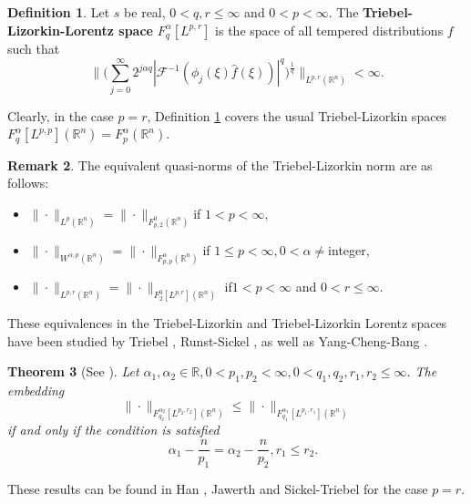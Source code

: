 \documentclass[12pt]{amsart}
\newcommand{\R}{\mathbb{R}}
\numberwithin{equation}{section}
\theoremstyle{plain}
\newtheorem{Thm}{Theorem}[section]
\theoremstyle{definition}
\newtheorem{Def}[Thm]{Definition}
\newtheorem{Rem}[Thm]{Remark}
\theoremstyle{remark}
\begin{document}
 \begin{Def}\label{Triebel}
 Let $s$ be real, $0<q,r\leq \infty$ and $0<p<\infty$. The \textbf{Triebel-Lizorkin-Lorentz  space} ${F}^{\alpha}_{q}[L^{p,r}]$ is the space of all tempered distributions $f$ such that
 \[
 \Big\| \Big(\sum_{j=0}^{\infty} 2^{j\alpha q} |\mathcal{F}^{-1}(\phi_{j}(\xi)\hat{f}(\xi))|^{q}\Big)^{\frac{1}{q}} \Big\|_{L^{p,r}(\R^{n})} <\infty.
 \]
 \end{Def}
 Clearly, in the case $p=r$, Definition \ref{Triebel} covers the usual Triebel-Lizorkin spaces ${F}^{\alpha}_{q}[L^{p,p}](\R^{n})=F^{\alpha}_{p}(\R^{n}).$
\begin{Rem}
The equivalent quasi-norms of the Triebel-Lizorkin norm are as follows:
\begin{itemize}
\item[(i)] $\|\cdot\|_{L^{p}(\R^{n})}=\|\cdot\|_{F^{0}_{p,2}(\R^{n})}$\;\;\quad\quad if \quad $1<p<\infty,$
\item[(ii)] $\|\cdot\|_{W^{\alpha,p}(\R^{n})}=\|\cdot\|_{F^{\alpha}_{p,p}(\R^{n})}$\;\;\quad if \quad $1\leq p<\infty, 0<\alpha\neq$integer,
\item[(iii)] $\|\cdot\|_{L^{p,r}(\R^{n})}=\|\cdot\|_{F^{0}_{2}[L^{p,r}](\R^{n})}$ \;if\quad\;$1<p<\infty$ and $0<r\leq \infty.$
\end{itemize}
These equivalences in the Triebel-Lizorkin and Triebel-Lizorkin Lorentz spaces have been studied by Triebel \cite{Tr}, Runst-Sickel \cite{RS}, as well as Yang-Cheng-Bang \cite{YCB}.
\end{Rem}

\begin{Thm}[{\text See \cite[Theorem 1.6]{ST} }]  \label{Lorentzembedding}
Let $\alpha_{1},\alpha_{2}\in\R, 0<p_{1},p_{2}<\infty, 0<q_{1},q_{2},r_{1},r_{2}\leq\infty.$ The embedding
\[
\|\cdot\|_{F^{\alpha_{2}}_{q_{2}}[L^{{p_{2},r_{2}}}](\R^{n})}\leq \|\cdot\|_{F^{\alpha_{1}}_{q_{1}}[L^{{p_{1},r_{1}}}](\R^{n})}
\]
if and only if the condition is satisfied
\[
\quad \alpha_{1}-\frac{n}{p_{1}}=\alpha_{2}-\frac{n}{p_{2}}, r_{1}\leq r_{2}.
\]
\end{Thm}
These results can be found in  Han \cite[Theorem]{Han}, Jawerth \cite[Theorem 2.1]{Bj} and Sickel-Triebel \cite[Theorem 3.2.1]{SiTr} for the case $p=r.$
\end{document}
